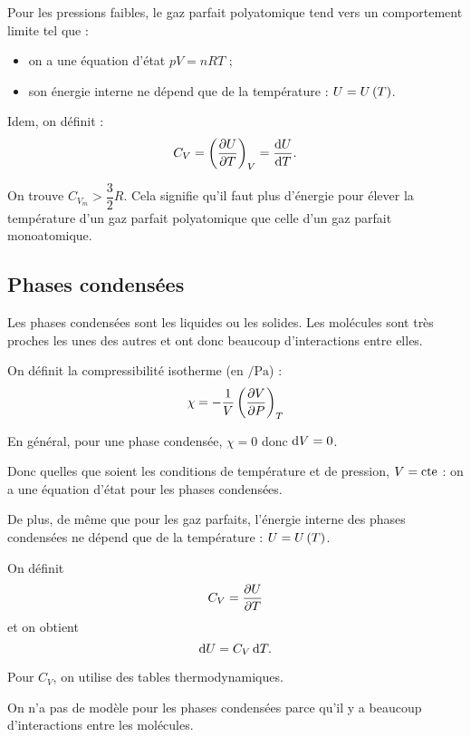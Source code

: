 Pour les pressions faibles, le gaz parfait polyatomique tend vers un comportement limite tel que : \begin{itemize}
\item on a une équation d'état \(pV=nRT\) ;

\item son énergie interne ne dépend que de la température : \(U=U\left(T\right)\). \\
\end{itemize}

Idem, on définit : \[C_V=\pdv{U}{T}_V=\odv{U}{T}.\]

On trouve \(C_{V_m}>\dfrac{3}{2}R\). Cela signifie qu'il faut plus d'énergie pour élever la température d'un gaz parfait polyatomique que celle d'un gaz parfait monoatomique.

\subsection{Phases condensées}

Les phases condensées sont les liquides ou les solides. Les molécules sont très proches les unes des autres et ont donc beaucoup d'interactions entre elles.

On définit la compressibilité isotherme (en \(\unit{\per\pascal}\)) : \[\chi=-\dfrac{1}{V}\pdv{V}{P}_T\]

En général, pour une phase condensée, \(\chi=0\) donc \(\odif{V}=0\).

Donc quelles que soient les conditions de température et de pression, \(V=\mathrm{cte}\) : on a une équation d'état pour les phases condensées.

De plus, de même que pour les gaz parfaits, l'énergie interne des phases condensées ne dépend que de la température : \(U=U\left(T\right)\).

On définit \[C_V=\pdv{U}{T}\] et on obtient \[\odif{U}=C_V\odif{T}.\]

Pour \(C_V\), on utilise des tables thermodynamiques.

On n'a pas de modèle pour les phases condensées parce qu'il y a beaucoup d'interactions entre les molécules.